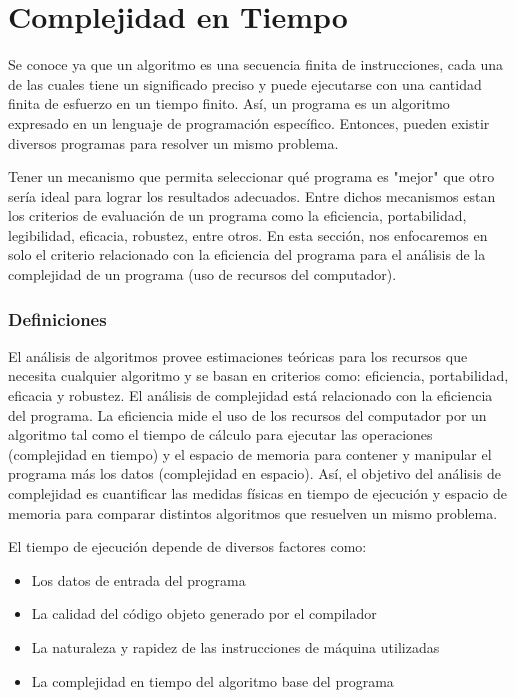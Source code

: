 \newpage
\part{Complejidad en Tiempo}
\setcounter{section}{0}

Se conoce ya que un algoritmo es una secuencia finita de instrucciones, cada una de las cuales tiene un significado preciso y puede ejecutarse con una cantidad finita de esfuerzo en un tiempo finito. Así, un programa es un algoritmo expresado en un lenguaje de programación específico. Entonces, pueden existir diversos programas para resolver un mismo problema. 

Tener un mecanismo que permita seleccionar qué programa es "mejor" que otro sería ideal para lograr los resultados adecuados. Entre dichos mecanismos estan los criterios de evaluación de un programa como la eficiencia, portabilidad, legibilidad, eficacia, robustez, entre otros. En esta sección, nos enfocaremos en solo el criterio relacionado con la eficiencia del programa para el análisis de la complejidad de un programa (uso de recursos del computador).


\section{Definiciones}

El análisis de algoritmos provee estimaciones teóricas para los recursos que necesita cualquier algoritmo y se basan en criterios como: eficiencia, portabilidad, eficacia y robustez. El análisis de complejidad está relacionado con la eficiencia del programa. La eficiencia mide el uso de los recursos del computador por un algoritmo tal como el tiempo de cálculo para ejecutar las operaciones (complejidad en tiempo) y el espacio de memoria para contener y manipular el programa más los datos (complejidad en espacio). Así, el objetivo del análisis de complejidad es cuantificar las medidas físicas en  tiempo de ejecución y espacio de memoria para comparar distintos algoritmos que resuelven un mismo problema.

El tiempo de ejecución depende de diversos factores como:
\begin{itemize}
\item Los datos de entrada del programa
\item La calidad del código objeto generado por el compilador
\item La naturaleza y rapidez de las instrucciones de máquina utilizadas
\item La complejidad en tiempo del algoritmo base del programa
\end{itemize}


